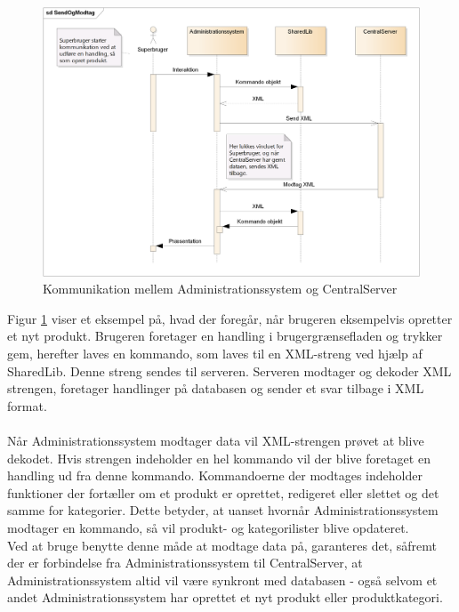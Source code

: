\begin{figure}[H]
	\centering
	\includegraphics[width=1\textwidth]{Projektbeskrivelse/DesignOgImplementering/Images/Administrationssystem-sekvensdiagram}
	\caption{Kommunikation mellem Administrationssystem og CentralServer}
	\label{fig:adminsekvens}
\end{figure}

Figur \ref{fig:adminsekvens} viser et eksempel på, hvad der foregår, når brugeren eksempelvis opretter et nyt produkt. Brugeren foretager en handling i brugergrænsefladen og trykker gem, herefter laves en kommando, som laves til en XML-streng ved hjælp af SharedLib. Denne streng sendes til serveren. Serveren modtager og dekoder XML strengen, foretager handlinger på databasen og sender et svar tilbage i XML format.\\\\
Når Administrationssystem modtager data vil XML-strengen prøvet at blive dekodet. Hvis strengen indeholder en hel kommando vil der blive foretaget en handling ud fra denne kommando. Kommandoerne der modtages indeholder funktioner der fortæller om et produkt er oprettet, redigeret eller slettet og det samme for kategorier. Dette betyder, at uanset hvornår Administrationssystem modtager en kommando, så vil produkt- og kategorilister blive opdateret.\\
Ved at bruge benytte denne måde at modtage data på, garanteres det, såfremt der er forbindelse fra Administrationssystem til CentralServer, at Administrationssystem altid vil være synkront med databasen - også selvom et andet Administrationssystem har oprettet et nyt produkt eller produktkategori.
